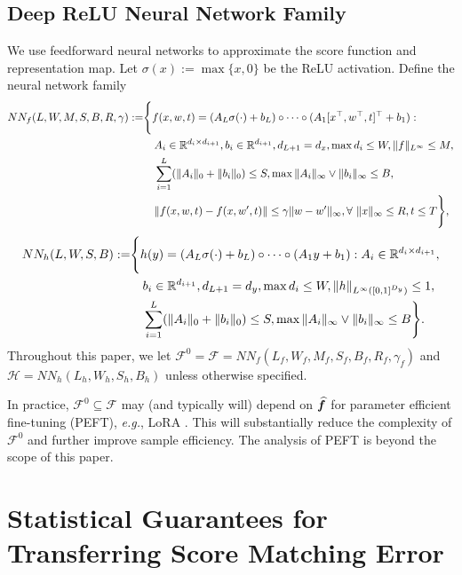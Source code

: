 \documentclass[11pt]{article}
\numberwithin{equation}{section}
\begin{document}
\subsection{Deep ReLU Neural Network Family}

We use feedforward neural networks to approximate the score function and representation map.
Let $\sigma(x):=\max\{x,0\}$ be the ReLU activation.
Define the neural network family 
\begin{equation}
    \begin{aligned}
        NN_f(L,W,M,S,B,R,\gamma):=
        &\Bigg\{f(x,w,t)=(A_L\sigma(\cdot)+b_L)\circ\cdots\circ(A_1[x^\top,w^\top,t]^\top+b_1): \\ 
        &\quad A_i\in\mathbb{R}^{d_i\times d_{i+1}}, b_i\in\mathbb{R}^{d_{i+1}}, d_{L+1}=d_x,\max d_i\leq W, \|f\|_{L^\infty}\leq M, \\
        &\quad \sum_{i=1}^L (\|A_i\|_0+\|b_i\|_0)\leq S, \max\|A_i\|_\infty\vee\|b_i\|_\infty\leq B, \\
        &\quad \|f(x,w,t)-f(x,w',t)\|\leq \gamma\|w-w'\|_\infty, \forall\ \|x\|_\infty\leq R,t\leq T \Bigg\},
    \end{aligned}
\end{equation}
\begin{equation}
    \begin{aligned}
        NN_h(L,W,S,B):=
        &\Bigg\{h(y)=(A_L\sigma(\cdot)+b_L)\circ\cdots\circ(A_1y+b_1): A_i\in\mathbb{R}^{d_i\times d_{i+1}}, \\ 
        &\quad  b_i\in\mathbb{R}^{d_{i+1}}, d_{L+1}=d_y,\max d_i\leq W, \|h\|_{L^\infty([0,1]^{D_y})}\leq 1, \\
        &\quad \sum_{i=1}^L (\|A_i\|_0+\|b_i\|_0)\leq S, \max\|A_i\|_\infty\vee\|b_i\|_\infty\leq B\Bigg\}.
    \end{aligned}
\end{equation}
Throughout this paper, we let $\mathcal{F}^0=\mathcal{F}=NN_f(L_f,W_f,M_f,S_f,B_f,R_f,\gamma_f)$ and $\mathcal{H}=NN_h(L_h,W_h,S_h,B_h)$ unless otherwise specified.
\begin{rmk}
    In practice, $\mathcal{F}^0\subseteq\mathcal{F}$ may (and typically will) depend on $\widehat{{\bm{f}}}$ for parameter efficient fine-tuning (PEFT), \textit{e.g.}, LoRA \citep{hu2021lora}. This will substantially reduce the complexity of $\mathcal{F}^0$ and further improve sample efficiency.
    The analysis of PEFT is beyond the scope of this paper.
\end{rmk}


\section{Statistical Guarantees for Transferring Score Matching Error}\label{sec:generalization}
\end{document}
